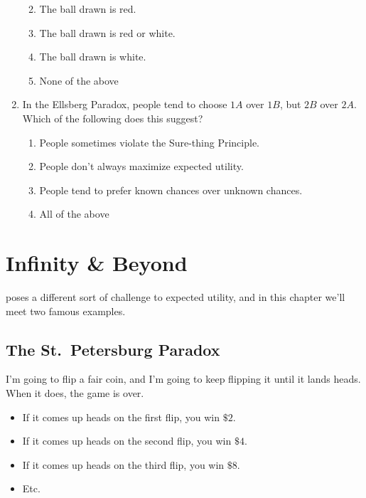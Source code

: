 \documentclass[justified]{tufte-book}
\providecommand{\tightlist}{%
  \setlength{\itemsep}{0pt}\setlength{\parskip}{0pt}}
\theoremstyle{definition}
\theoremstyle{definition}
\theoremstyle{definition}
\theoremstyle{remark}
\begin{document}
\begin{enumerate}
  \begin{enumerate}
  \def\labelenumii{\alph{enumii}.}
  \tightlist
  \item
    The ball drawn is red.
  \item
    The ball drawn is red or white.
  \item
    The ball drawn is white.
  \item
    None of the above
  \end{enumerate}
\item
  In the Ellsberg Paradox, people tend to choose \(1A\) over \(1B\), but
  \(2B\) over \(2A\). Which of the following does this suggest?

  \begin{enumerate}
  \def\labelenumii{\alph{enumii}.}
  \tightlist
  \item
    People sometimes violate the Sure-thing Principle.
  \item
    People don't always maximize expected utility.
  \item
    People tend to prefer known chances over unknown chances.
  \item
    All of the above
  \end{enumerate}
\end{enumerate}

\hypertarget{infinity-beyond}{%
\chapter{Infinity \& Beyond}\label{infinity-beyond}}

 poses a different sort of challenge to expected
utility, and in this chapter we'll meet two famous examples.

\hypertarget{the-st.petersburg-paradox}{%
\section{The St.~Petersburg Paradox}\label{the-st.petersburg-paradox}}

 I'm going to flip a fair coin, and I'm going to
keep flipping it until it lands heads. When it does, the game is over.

\begin{itemize}
\tightlist
\item
  If it comes up heads on the first flip, you win \(\$2\).
\item
  If it comes up heads on the second flip, you win \(\$4\).
\item
  If it comes up heads on the third flip, you win \(\$8\).
\item
  Etc.
\end{itemize}
\end{document}
